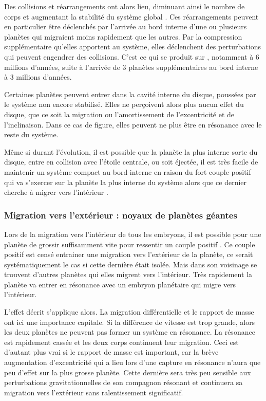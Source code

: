 Des collisions et réarrangements ont alors lieu, diminuant ainsi le nombre de corps et augmentant la stabilité du système global
 \citep{morbidelli2008building}. Ces réarrangements peuvent en particulier être déclenchés par
l'arrivée au bord interne d'une ou plusieurs planètes qui migraient moins rapidement que les autres. Par la compression
supplémentaire qu'elles apportent au système, elles déclenchent des perturbations qui peuvent engendrer des collisions. C'est ce
qui se produit sur  , notamment à 6 millions d'années, suite à l'arrivée de 3 planètes
supplémentaires au bord interne à 3 millions d'années. 

\bigskip

Certaines planètes peuvent entrer dans la cavité interne du disque, poussées par le système non encore stabilisé. Elles ne perçoivent alors plus aucun effet du disque, que ce soit la migration ou l'amortissement de l'excentricité et de l'inclinaison. Dans ce cas de figure, elles peuvent ne plus être en résonance avec le reste du système. 

Même si durant l'évolution, il est possible que la planète la plus interne sorte du disque, entre en collision avec l'étoile
centrale, ou soit éjectée, il est très facile de maintenir un système compact au bord interne en raison du fort couple positif
qui va s'exercer sur la planète la plus interne du système alors que ce dernier cherche à migrer vers l'intérieur
\citep{masset2006disk, morbidelli2008building, terquem2007migration}.

\subsubsection{Migration vers l'extérieur : noyaux de planètes géantes}\label{sec:outward-case}
Lors de la migration vers l'intérieur de tous les embryons, il est possible pour une planète de grossir suffisamment vite pour ressentir un couple positif . Ce couple positif est censé entrainer une migration vers l'extérieur de la planète, ce serait systématiquement le cas si cette dernière était isolée. Mais dans son voisinage se trouvent d'autres planètes qui elles migrent vers l'intérieur. Très rapidement la planète va entrer en résonance avec un embryon planétaire qui migre vers l'intérieur.

L'effet décrit  s'applique alors. La migration différentielle et le rapport de masse ont ici une importance capitale. Si la différence de vitesse est trop grande, alors les deux planètes ne peuvent pas former un système en résonance. La résonance est rapidement cassée et les deux corps continuent leur migration. Ceci est d'autant plus vrai si le rapport de masse est important, car la brève augmentation d'excentricité qui a lieu lors d'une capture en résonance n'aura que peu d'effet sur la plus grosse planète. Cette dernière sera très peu sensible aux perturbations gravitationnelles de son compagnon résonant et continuera sa migration vers l'extérieur sans ralentissement significatif. 

